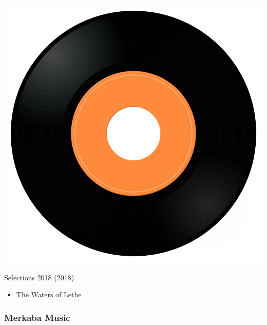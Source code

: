 \begin{minipage}[t]{0.25\textwidth}\vspace{0pt}
\captionsetup{type=figure}
\includegraphics[width=\textwidth]{Images/cover.png}
\caption*{Selections 2018 (2018)}
\end{minipage}
\begin{minipage}[t]{0.25\textwidth}\vspace{0pt}
\begin{itemize}[nosep,leftmargin=1em,labelwidth=*,align=left]
	\setlength{\itemsep}{0pt}
	\item	The Waters of Lethe
\end{itemize}
\end{minipage}

\subsubsection{Merkaba Music}

